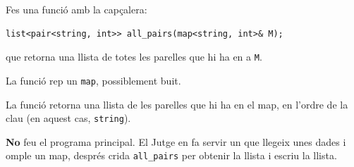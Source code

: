 

\Statement

Fes una funció amb la capçalera:

\begin{verbatim}
list<pair<string, int>> all_pairs(map<string, int>& M);
\end{verbatim}

que retorna una llista de totes les parelles que hi ha en
a \verb|M|.

\Input

La funció rep un \verb|map|, possiblement buit.

\Output

La funció retorna una llista de les parelles que hi ha en el 
map, en l'ordre de la clau (en aquest cas, \verb|string|).

\Observation

\textbf{No} feu el programa principal. El Jutge en fa servir un 
que llegeix unes dades i omple un map, després crida 
\verb|all_pairs| per obtenir la llista i escriu la llista.

\SampleTwoCol
